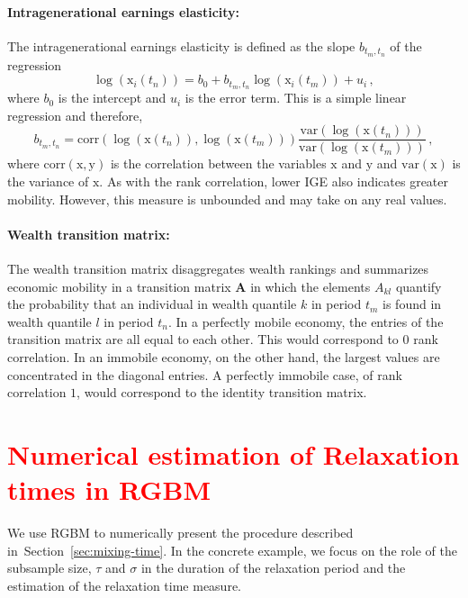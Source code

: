 \documentclass[11pt]{article}
\newcommand{\Sref}[1]{Section~\ref{sec:#1}}
\newcommand{\be}{\begin{equation}}
\newcommand{\ee}{\end{equation}}
\numberwithin{equation}{section}
\begin{document}
\paragraph{Intragenerational earnings elasticity:} The intragenerational earnings elasticity is defined as the slope $b_{t_m,t_n}$ of the regression
%
\be
   \log\left(\mathrm{x}_i\left(t_n\right)\right) = b_0 + b_{t_m,t_n} \log\left(\mathrm{x}_i\left(t_m\right)\right) + u_i\,,
\ee
%
where $b_0$ is the intercept and $u_i$ is the error term. This is a simple linear regression and therefore,
%
\be
    b_{t_m,t_n} = \mathrm{corr}\left(\log\left(\mathrm{x}\left(t_n\right)\right),\log\left(\mathrm{x}\left(t_m\right)\right)\right) \frac{\mathrm{var}\left(\log\left(\mathrm{x}\left(t_n\right)\right)\right)}{\mathrm{var}\left(\log\left(\mathrm{x}\left(t_m\right)\right)\right)}\,,
    \label{eq:iee-estimation}
\ee
%
where $\mathrm{corr}(\mathrm{x},\mathrm{y})$ is the correlation between the variables $\mathrm{x}$ and $\mathrm{y}$ and $\mathrm{var}(\mathrm{x})$ is the variance of $\mathrm{x}$. As with the rank correlation, lower IGE also indicates greater mobility. However, this measure is unbounded and may take on any real values.

\paragraph{Wealth transition matrix:} The wealth transition matrix disaggregates wealth rankings and summarizes economic mobility in a
transition matrix $\mathbf{A}$ in which the elements $A_{kl}$ quantify the probability that an individual in wealth quantile $k$ in period $t_m$ is found in wealth quantile $l$ in period $t_n$. In a perfectly mobile economy, the entries of the transition matrix are all equal to each other. This would correspond to $0$ rank correlation. In an immobile economy, on the other hand, the largest values are concentrated in the diagonal entries. A perfectly immobile case, of rank correlation $1$, would correspond to the identity transition matrix.

\section{\textcolor{red}{Numerical estimation of Relaxation times in RGBM}}\label{sec:rgbm-numerical-mixing-time}

We use RGBM to numerically present the procedure described in~\Sref{mixing-time}. In the concrete example, we focus on the role of the subsample size, $\tau$ and $\sigma$ in the duration of the relaxation period and the estimation of the relaxation time measure. 
\end{document}
